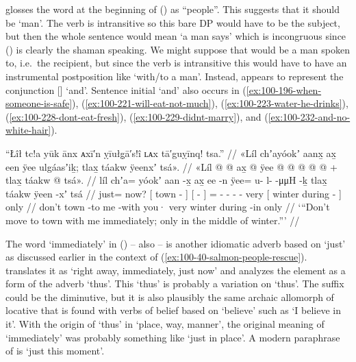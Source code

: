 \citeauthor{swanton:1909} glosses the word  at the beginning of (\lastx) as “people”.
This suggests that it should be  ‘man’.
The verb is intransitive so this bare DP would have to be the subject, but then the whole sentence would mean ‘a man says’ which is incongruous since (\nextx) is clearly the shaman speaking.
We might suppose that  would be a man spoken to, i.e.\ the recipient, but since the verb is intransitive this would have to have an instrumental postposition like  ‘with/to a man’.
Instead,  appears to represent the conjunction  [] ‘and’.
Sentence initial  ‘and’ also occurs in (\ref{ex:100-196-when-someone-is-safe}), (\ref{ex:100-221-will-eat-not-much}), (\ref{ex:100-223-water-he-drinks}), (\ref{ex:100-228-dont-eat-fresh}), (\ref{ex:100-229-didnt-marry}), and (\ref{ex:100-232-and-no-white-hair}).

\ex\label{ex:100-201-dont-move-immediately}%
%
\begingl
	\glpreamble	“Łîł tc!a yūk ānx ᴀxī′n ỵīułg̣ā′s!î ʟᴀx tā′guỵīnq! tsa.” //
	\glpreamble	«\!Líl chʼayóokʼ aanx̱ ax̱ een ÿee ulgáasʼiḵ; tlax̱ táakw ÿeenxʼ tsá\!». //
	\gla	«\!Líl  @ {}
		{}  @ {} {}
		{} ax̱  @ {} {}
		ÿee @  @ {} @ {} @ {} @ {} +
		tlax̱ {} táakw  @ {} {} tsá\!». //
	\glb	\pqp{}líl chʼa= yóokʼ
		{} aan -x̱ {}
		{} ax̱ ee -n {}
		ÿee= u- l-  -μμH -ḵ
		tlax̱ {} táakw ÿeen -xʼ {} tsá //
	\glc	\pqp{} just= now?
		{}[ town - {}]
		{}[   - {}]
		= - -  - -
		very {}[ winter during - {}] only //
	\gld	\pqp{}don’t  {}
		{} town -to {} 
		{} me {} -with {}
		you·  {} {} {} {}
		very {} winter during -in {} only //
	\glft	‘“Don’t move to town with me immediately; only in the middle of winter.”’
		//
\endgl
\xe

The word  ‘immediately’ in (\lastx) – also  – is another idiomatic adverb based on  ‘just’ as discussed earlier in the context of (\ref{ex:100-40-salmon-people-rescue}).
\citeauthor{leer:1973} translates it as ‘right away, immediately, just now’ \parencite[03/85]{leer:1973} and analyzes the  element as a form of the adverb  ‘thus’.
This  ‘thus’ is probably a variation on  ‘thus’.
The  suffix could be the diminutive, but it is also plausibly the same archaic allomorph of locative  that is found with verbs of belief based on  ‘believe’ such as  ‘I believe in it’.
With the origin of  ‘thus’ in  ‘place, way, manner’, the original meaning of  ‘immediately’ was probably something like ‘just in place’.
A modern paraphrase of  is  ‘just this moment’.


